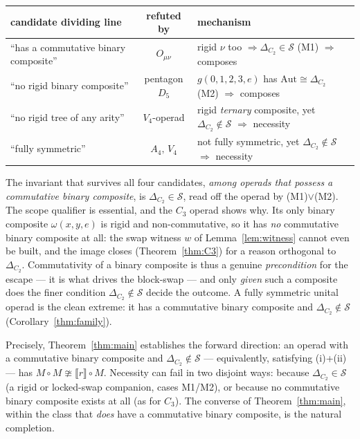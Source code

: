 \documentclass[11pt]{amsart}
\theoremstyle{plain}
\theoremstyle{definition}
\newcommand{\ext}[1]{\llbracket #1 \rrbracket}
\begin{document}
\begin{center}\small
\renewcommand{\arraystretch}{1.3}
\begin{tabular}{lcl}
\hline
candidate dividing line & refuted by & mechanism\\
\hline
``has a commutative binary composite'' & $O_{\mu\nu}$ & rigid $\nu$ too $\Rightarrow\Delta_{C_2}\in\mathcal S$ (M1) $\Rightarrow$ composes\\
``no rigid binary composite'' & pentagon $D_5$ & $g(0,1,2,3,e)$ has $\mathrm{Aut}\cong\Delta_{C_2}$ (M2) $\Rightarrow$ composes\\
``no rigid tree of any arity'' & $V_4$-operad & rigid \emph{ternary} composite, yet $\Delta_{C_2}\notin\mathcal S$ $\Rightarrow$ necessity\\
``fully symmetric'' & $A_4,\,V_4$ & not fully symmetric, yet $\Delta_{C_2}\notin\mathcal S$ $\Rightarrow$ necessity\\
\hline
\end{tabular}
\end{center}

The invariant that survives all four candidates, \emph{among operads that possess a commutative binary
composite}, is $\Delta_{C_2}\in\mathcal S$, read off the operad by (M1)$\vee$(M2). The scope qualifier is
essential, and the $C_3$ operad shows why. Its only binary composite $\omega(x,y,e)$ is rigid and
non-commutative, so it has \emph{no} commutative binary composite at all: the swap witness $w$ of
Lemma~\ref{lem:witness} cannot even be built, and the image closes (Theorem~\ref{thm:C3}) for a reason
orthogonal to $\Delta_{C_2}$. Commutativity of a binary composite is thus a genuine \emph{precondition}
for the escape --- it is what drives the block-swap --- and only \emph{given} such a composite does the
finer condition $\Delta_{C_2}\notin\mathcal S$ decide the outcome. A fully symmetric unital operad is the
clean extreme: it has a commutative binary composite and $\Delta_{C_2}\notin\mathcal S$
(Corollary~\ref{thm:family}).

Precisely, Theorem~\ref{thm:main} establishes the forward direction: an operad with a commutative binary
composite and $\Delta_{C_2}\notin\mathcal S$ --- equivalently, satisfying (i)+(ii) --- has $M\circ
M\ncong\ext r\circ M$. Necessity can fail in two disjoint ways: because $\Delta_{C_2}\in\mathcal S$ (a
rigid or locked-swap companion, cases M1/M2), or because no commutative binary composite exists at all
(as for $C_3$). The converse of Theorem~\ref{thm:main}, within the class that \emph{does} have a
commutative binary composite, is the natural completion.
\end{document}
